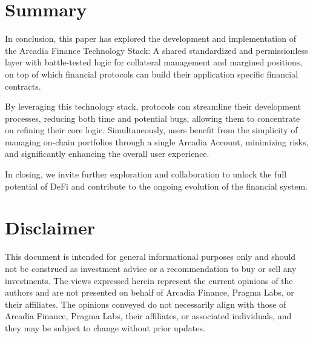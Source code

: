 \documentclass[sigconf,nonacm]{acmart}
\begin{document}
\balance
\section{Summary}
\label{sec:summary}
In conclusion, this paper has explored the development and implementation of the Arcadia Finance Technology Stack:
A shared standardized and permissionless layer with battle-tested logic for collateral management and margined positions,
on top of which financial protocols can build their application specific financial contracts.

By leveraging this technology stack, protocols can streamline their development processes, reducing both time and potential bugs,
allowing them to concentrate on refining their core logic.
Simultaneously, users benefit from the simplicity of managing on-chain portfolios through a single Arcadia Account, minimizing risks,
and significantly enhancing the overall user experience.

In closing, we invite further exploration and collaboration to unlock the full potential of DeFi and contribute to the ongoing evolution of the financial system.

\section*{Disclaimer}
This document is intended for general informational purposes only and should not be construed as investment advice or
a recommendation to buy or sell any investments.
The views expressed herein represent the current opinions of the authors and are not presented on behalf of Arcadia Finance, Pragma Labs, or their affiliates.
The opinions conveyed do not necessarily align with those of Arcadia Finance, Pragma Labs, their affiliates, or associated individuals,
and they may be subject to change without prior updates.



\end{document}
